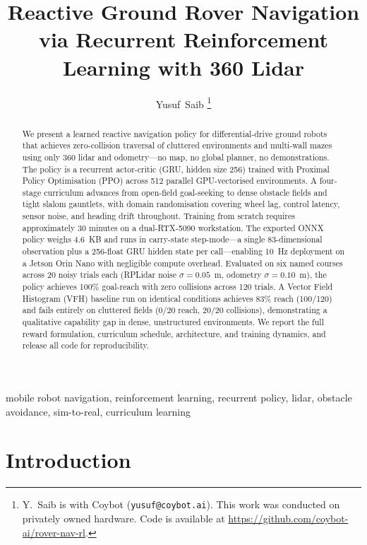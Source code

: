 \documentclass[letterpaper, 10pt, journal]{IEEEtran}
\title{Reactive Ground Rover Navigation via Recurrent Reinforcement Learning
       with 360\textdegree{} Lidar}
\author{Yusuf~Saib%
  \thanks{Y.~Saib is with Coybot (\texttt{yusuf@coybot.ai}).
  This work was conducted on privately owned hardware.
  Code is available at \url{https://github.com/coybot-ai/rover-nav-rl}.}}
\begin{document}
\maketitle

\begin{abstract}
We present a learned reactive navigation policy for differential-drive ground robots
that achieves zero-collision traversal of cluttered environments and multi-wall mazes
using only 360\textdegree{} lidar and odometry---no map, no global planner, no
demonstrations.
The policy is a recurrent actor-critic (GRU, hidden size 256) trained with Proximal
Policy Optimisation (PPO) across 512 parallel GPU-vectorised environments.
A four-stage curriculum advances from open-field goal-seeking to dense obstacle fields
and tight slalom gauntlets, with domain randomisation covering wheel lag, control
latency, sensor noise, and heading drift throughout.
Training from scratch requires approximately 30 minutes on a dual-RTX-5090 workstation.
The exported ONNX policy weighs 4.6~KB and runs in carry-state step-mode---a single
83-dimensional observation plus a 256-float GRU hidden state per call---enabling
10~Hz deployment on a Jetson Orin Nano with negligible compute overhead.
Evaluated on six named courses across 20 noisy trials each
(RPLidar noise $\sigma{=}0.05$~m, odometry $\sigma{=}0.10$~m),
the policy achieves 100\% goal-reach with zero collisions across 120 trials.
A Vector Field Histogram (VFH) baseline run on identical conditions
achieves 83\% reach (100/120) and fails entirely on cluttered fields (0/20 reach,
20/20 collisions), demonstrating a qualitative capability gap in dense, unstructured
environments.
We report the full reward formulation, curriculum schedule, architecture, and training
dynamics, and release all code for reproducibility.
\end{abstract}

\begin{IEEEkeywords}
mobile robot navigation, reinforcement learning, recurrent policy, lidar,
obstacle avoidance, sim-to-real, curriculum learning
\end{IEEEkeywords}

\section{Introduction}
\end{document}
